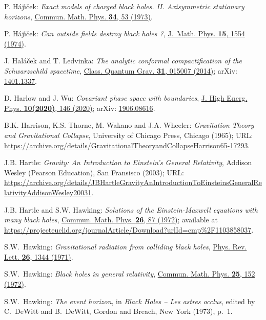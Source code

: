 \begin{thebibliography}{123}
P. H\'aj\'{\i}\v{c}ek:
{\em Exact models of charged black holes.
II. Axisymmetric stationary horizons},
\href{https://doi.org/10.1007/BF01646542}{Commun. Math. Phys. {\bf 34}, 53 (1973)}.

P. H\'aj\'{\i}\v{c}ek:
{\em Can outside fields destroy black holes ?},
\href{https://doi.org/10.1063/1.1666846}{J.~Math. Phys. {\bf 15}, 1554 (1974)}.

J. Hal\'a\v{c}ek and T. Ledvinka:
{\em The analytic conformal compactification of the Schwarzschild spacetime},
\href{https://doi.org/10.1088/0264-9381/31/1/015007}{Class. Quantum Grav. {\bf 31}, 015007 (2014)};
arXiv: \href{https://arxiv.org/abs/1401.1337}{1401.1337}.

D. Harlow and J. Wu:
{\em Covariant phase space with boundaries},
\href{https://doi.org/10.1007/JHEP10(2020)146}{J. High Energ. Phys. {\bf 10(2020)}, 146 (2020)};
arXiv: \href{https://arxiv.org/abs/1906.08616}{1906.08616}.

B.K. Harrison, K.S. Thorne, M. Wakano and J.A. Wheeler:
{\em Gravitation Theory and Gravitational Collapse},
University of Chicago Press, Chicago (1965);
URL: {\footnotesize\url{https://archive.org/details/GravitationalTheoryandCollapseHarrison65-17293}}.

J.B. Hartle: \emph{Gravity: An Introduction to Einstein's General Relativity},
Addison Wesley (Pearson Education), San Fransisco (2003);
URL: {\footnotesize\url{https://archive.org/details/JBHartleGravityAnIntroductionToEinsteinsGeneralRelativityAddisonWesley20031}}.

J.B. Hartle and S.W. Hawking:
{\em Solutions of the Einstein-Maxwell equations with many black holes},
\href{https://doi.org/10.1007/BF01645696}{Commun. Math. Phys. {\bf 26}, 87 (1972)};
available at {\footnotesize\url{https://projecteuclid.org/journalArticle/Download?urlId=cmp%2F1103858037}}.

S.W.~Hawking:
{\em Gravitational radiation from colliding black holes},
\href{https://doi.org/10.1103/PhysRevLett.26.1344}{Phys. Rev. Lett. {\bf 26}, 1344 (1971)}.

S.W.~Hawking:
{\em Black holes in general relativity},
\href{https://doi.org/10.1007/BF01877517}{Commun. Math. Phys. {\bf 25}, 152 (1972)}.

S.W.~Hawking:
{\em The event horizon},
in {\em Black Holes -- Les astres occlus}, edited by C.~DeWitt and B.~DeWitt,
Gordon and Breach, New York (1973), p.~1.


\end{thebibliography}

